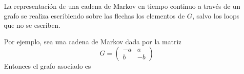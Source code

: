 \documentclass[PREyA.tex]{subfiles}
\begin{document}
\begin{nota}
La representación de una cadena de Markov en tiempo continuo a través de un grafo se realiza escribiendo sobre las flechas los elementos de $G$, salvo los loops que no se escriben. 

Por ejemplo, sea una cadena de Markov dada por la matriz
$$
G= 
\begin{pmatrix}
-a & a\\
b & -b
\end{pmatrix}
$$
Entonces el grafo asociado es
\begin{center}
\end{center}
\end{nota}
\end{document}
